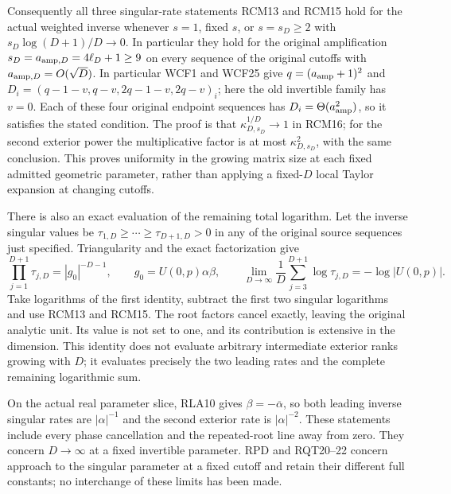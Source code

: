 \documentclass[11pt]{article}
\begin{document}
Consequently all three singular-rate statements RCM13 and RCM15
hold for the actual weighted inverse whenever $s=1$, fixed $s$,
or $s=s_D\ge2$ with $s_D\log(D+1)/D\to0$.
In particular they hold for the original amplification
$s_D=a_{{\rm amp},D}=4\ell_D+1\ge9$ on every sequence of the
original cutoffs with $a_{{\rm amp},D}=O(\sqrt D)$.
In particular WCF1 and WCF25 give $q=(a_{\rm amp}+1)^2$ and
$D_i=(q-1-v,q-v,2q-1-v,2q-v)_i$; here the old invertible
family has $v=0$. Each of these four original endpoint sequences
has $D_i=\Theta(a_{\rm amp}^2)$, so it satisfies the stated condition.
The proof is that $\kappa_{D,s_D}^{1/D}\to1$ in RCM16;
for the second exterior power the multiplicative factor is
at most $\kappa_{D,s_D}^2$, with the same conclusion.
This proves uniformity in the growing matrix size at each fixed
admitted geometric parameter, rather than applying a fixed-$D$
local Taylor expansion at changing cutoffs.

There is also an exact evaluation of the remaining total logarithm.
Let the inverse singular values be $\tau_{1,D}\ge\cdots\ge
\tau_{D+1,D}>0$ in any of the original source sequences just
specified.  Triangularity and the exact factorization give
\[
 \prod_{j=1}^{D+1}\tau_{j,D}=|g_0|^{-D-1},\qquad
 g_0=U(0,p)\alpha\beta,\qquad
 \lim_{D\to\infty}\frac1D\sum_{j=3}^{D+1}\log\tau_{j,D}
             =-\log|U(0,p)|.
 \tag{RCM17}
\]
Take logarithms of the first identity, subtract the first two
singular logarithms and use RCM13 and RCM15.  The root factors
cancel exactly, leaving the original analytic unit.  Its value
is not set to one, and its contribution is extensive in the
dimension.  This identity does not evaluate arbitrary intermediate
exterior ranks growing with $D$; it evaluates precisely the two
leading rates and the complete remaining logarithmic sum.

On the actual real parameter slice, RLA10 gives
$\beta=-\overline\alpha$, so both leading inverse singular
rates are $|\alpha|^{-1}$ and the second exterior rate is
$|\alpha|^{-2}$.  These statements include every phase
cancellation and the repeated-root line away from zero.
They concern $D\to\infty$ at a fixed invertible parameter.
RPD and RQT20--22 concern approach to the singular parameter
at a fixed cutoff and retain their different full constants;
no interchange of these limits has been made.
\end{document}
